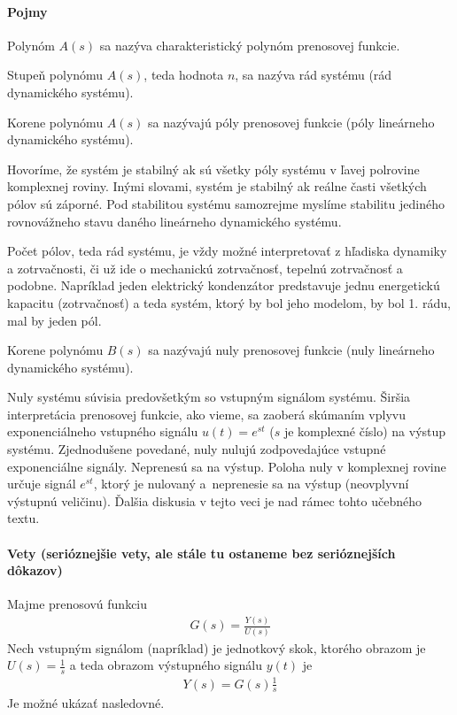 \documentclass[a4paper, 10pt, ]{article}
\begin{document}
\paragraph{Pojmy}

Polynóm $A(s)$ sa nazýva charakteristický polynóm prenosovej funkcie.

Stupeň polynómu $A(s)$, teda hodnota $n$, sa nazýva rád systému (rád dynamického systému).

Korene polynómu $A(s)$ sa nazývajú póly prenosovej funkcie (póly lineárneho dynamického systému).

Hovoríme, že systém je stabilný ak sú všetky póly systému v ľavej polrovine komplexnej roviny. Inými slovami, systém je stabilný ak reálne časti všetkých pólov sú záporné. Pod stabilitou systému samozrejme myslíme stabilitu jediného rovnovážneho stavu daného lineárneho dynamického systému.

Počet pólov, teda rád systému, je vždy možné interpretovať z hľadiska dynamiky a zotrvačnosti, či už ide o mechanickú zotrvačnosť, tepelnú zotrvačnosť a podobne. Napríklad jeden elektrický kondenzátor predstavuje jednu energetickú kapacitu (zotrvačnosť) a teda systém, ktorý by bol jeho modelom, by bol 1. rádu, mal by jeden pól.


\bigskip

Korene polynómu $B(s)$ sa nazývajú nuly prenosovej funkcie (nuly lineárneho dynamického systému).

Nuly systému súvisia predovšetkým so vstupným signálom systému. Širšia interpretácia prenosovej funkcie, ako vieme, sa zaoberá skúmaním vplyvu exponenciálneho vstupného signálu $u(t) = e^{st}$ ($s$ je komplexné číslo) na výstup systému. Zjednodušene povedané, nuly nulujú zodpovedajúce vstupné exponenciálne signály. Neprenesú sa na výstup. Poloha nuly v komplexnej rovine určuje signál $e^{st}$, ktorý je nulovaný a~neprenesie sa na výstup (neovplyvní výstupnú veličinu). Ďalšia diskusia v tejto veci je nad rámec tohto učebného textu.



\paragraph{Vety {\color{Gray} \small (serióznejšie vety, ale stále tu ostaneme bez serióznejších dôkazov)}}

Majme prenosovú funkciu
\begin{align}
	G(s) = \frac{Y(s)}{U(s)}
\end{align}
Nech vstupným signálom (napríklad) je jednotkový skok, ktorého obrazom je $U(s) = \frac{1}{s}$ a teda obrazom výstupného signálu $y(t)$ je
\begin{align}
	Y(s) = G(s)\frac{1}{s}
\end{align}
Je možné ukázať nasledovné.
\end{document}
